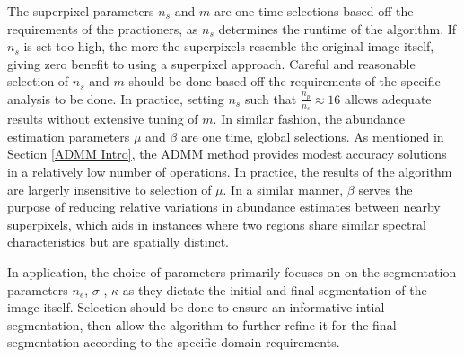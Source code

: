 The superpixel parameters $n_s$ and $m$ are one time selections based off the requirements of the practioners, as $n_s$ determines the runtime of the algorithm. If $n_s$ is set too high, the more the superpixels resemble the original image itself, giving zero benefit to using a superpixel approach. Careful and reasonable selection of $n_s$ and $m$ should be done based off the requirements of the specific analysis to be done. In practice, setting $n_s$ such that $\frac{n_p}{n_s} \approx 16$ allows adequate results without extensive tuning of $m$. In similar fashion, the abundance estimation parameters $\mu$ and $\beta$ are one time, global selections. As mentioned in Section \ref{ADMM Intro}, the ADMM method provides modest accuracy solutions in a relatively low number of operations. In practice, the results of the algorithm are largerly insensitive to selection of $\mu$. In a similar manner, $\beta$ serves the purpose of reducing relative variations in abundance estimates between nearby superpixels, which aids in instances where two regions share similar spectral characteristics but are spatially distinct. 

In application, the choice of parameters primarily focuses on on the segmentation parameters $n_e$, $\sigma$ , $\kappa$ as they dictate the initial and final segmentation of the image itself. Selection should be done to ensure an informative intial segmentation, then allow the algorithm to further refine it for the final segmentation according to the specific domain requirements.